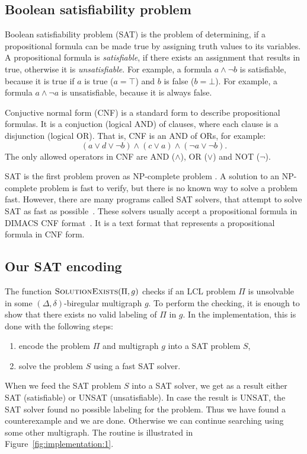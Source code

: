 \subsection{Boolean satisfiability problem} \label{sec:implementation:sat}

Boolean satisfiability problem (SAT) is the problem of determining, if a propositional formula can be made true by assigning truth values to its variables.
A propositional formula is \emph{satisfiable}, if there exists an assignment that results in true, otherwise it is \emph{unsatisfiable}.
For example, a formula $a \land \neg b$ is satisfiable, because it is true if $a$ is true ($a=\top$) and $b$ is false ($b=\bot$).
For example, a formula $a \land \neg a$ is unsatisfiable, because it is always false.

Conjuctive normal form (CNF) is a standard form to describe propositional formulas.
It is a conjuction (logical AND) of clauses, where each clause is a disjunction (logical OR).
That is, CNF is an AND of ORs, for example:
$$(a \lor d \lor \neg b)\land (c \lor a) \land (\neg a \lor  \neg b).$$
The only allowed operators in CNF are AND ($\land$), OR ($\lor$) and NOT ($\neg$).

SAT is the first problem proven as NP-complete problem \cite{DBLP:conf/stoc/Cook71}.
A solution to an NP-complete problem is fast to verify, but there is no known way to solve a problem fast.
However, there are many programs called SAT solvers, that attempt to solve SAT as fast as possible~\cite{TheInternationalSATCompetitionWebPage}.
These solvers usually accept a propositional formula in DIMACS CNF format~\cite{DIMACS:CNF}.
It is a text format that represents a propositional formula in CNF form.

\subsection{Our SAT encoding} \label{sec:implementation:our_sat}


The function $\textsc{SolutionExists}(\Pi, g)$ checks if an LCL problem $\Pi$ is unsolvable in some $(\Delta, \delta)$-biregular multigraph $g$.
To perform the checking, it is enough to show that there exists no valid labeling of $\Pi$ in $g$.
In the implementation, this is done with the following steps:
\begin{enumerate}
    \item encode the problem $\Pi$ and multigraph $g$ into a SAT problem $S$,
    \item solve the problem $S$ using a fast SAT solver.
\end{enumerate}
When we feed the SAT problem $S$ into a SAT solver, we get as a result either SAT (satisfiable) or UNSAT (unsatisfiable).
In case the result is UNSAT, the SAT solver found no possible labeling for the problem.
Thus we have found a counterexample and we are done.
Otherwise we can continue searching using some other multigraph.
The routine is illustrated in Figure~\ref{fig:implementation:1}.

